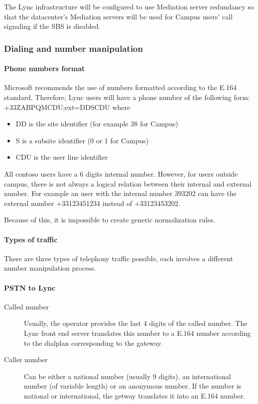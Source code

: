 The Lync infrastructure will be configured to use Mediation server redundancy so that the datacenter's Mediation servers will be used for Campus users' call signaling if the SBS is disabled.

\subsubsection{Dialing and number manipulation}
	\paragraph{Phone numbers format}
	Microsoft recommends the use of numbers formatted according to the E.164 standard. Therefore, Lync users will have a phone number of the following form: +33ZABPQMCDU;ext=DDSCDU where
	\begin{itemize}
		\item DD is the site identifier (for example 38 for Campus)
		\item S is a subsite identifier (0 or 1 for Campus)
		\item CDU is the user line identifier
	\end{itemize}
	
	All contoso users have a 6 digits internal number. However, for users outside campus, there is not always a logical relation between their internal and external number. For example an user with the internal number 393202 can have the external number +33123451234 instead of +33123453202.
	
	Because of this, it is impossible to create generic normalization rules.
	
	
	\paragraph{Types of traffic}
	There are three types of telephony traffic possible, each involves a different number manipulation process.
	
	\paragraph{PSTN to Lync}
	\begin{description}
		\item[Called number] Usually, the operator provides the last 4 digits of the called number. The Lync front end server translates this number to a E.164 number according to the dialplan corresponding to the gateway.
		\item[Caller number] Can be either a national number (usually 9 digits), an international number (of variable length) or an anonymous number. If the number is national or international, the getway translates it into an E.164 number.
	\end{description}

